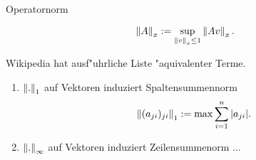 \documentclass[class=article, crop=false]{standalone}
\begin{document}
\begin{zettel}{Operatornorm}
\begin{flashcard}{}
	\begin{definition}[Operatornorm]
		\[
			\left\|A\right\|_x := \sup_{ \left\|v\right\|_x \leq  1 } \left\|Av\right\|_x
		.\]
	\end{definition}
\end{flashcard}
Wikipedia hat ausf"uhrliche Liste "aquivalenter Terme.
\begin{remark}
	\begin{enumerate}
		\item $\left\|.\right\|_1$ auf Vektoren induziert Spaltensummennorm
		      \[
			      \left\|(a_{ji})_{ji} \right\|_1 := \max \sum_{i =1}^{n} |a_{ji}|
		      .\]
		\item $\left\|.\right\|_{\infty}$ auf Vektoren induziert Zeilensummenorm $\dots$
	\end{enumerate}
\end{remark}
\end{zettel}
\end{document}
